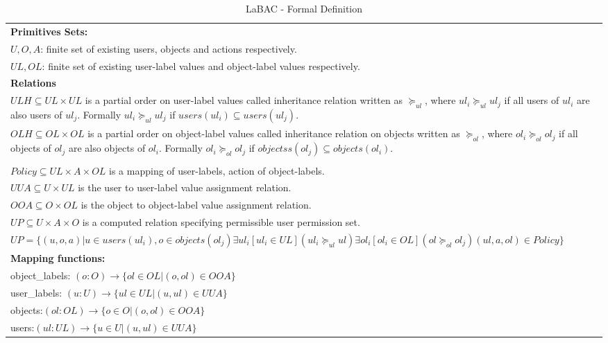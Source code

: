 \begin{table}[t] \footnotesize
\centering
\caption{LaBAC - Formal Definition}
\label{table:labac-formal-model}
\begin{tabular}{p{\textwidth}}

\hline
\noindent \textbf{ Primitives Sets:} \\
$U, O, A$: finite set of existing users, objects and actions respectively. \\
$UL, OL$: finite set of existing user-label values  and object-label values respectively. \\
\noindent \textbf{Relations} \\
$ULH \subseteq UL \times UL$  is a partial order on user-label values called inheritance relation written as $\succeq_{ul}$, where $ul_i \succeq_{ul} ul_j$ if all users of $ul_i$ are also users of $ul_j$. Formally $ul_i \succeq_{ul} ul_j$ if $users(ul_i) \subseteq users(ul_j)$. \\

$OLH \subseteq OL \times OL$  is a partial order on object-label values called inheritance relation on objects written as $\succeq_{ol}$, where $ol_i \succeq_{ol} ol_j$ if all objects of $ol_j$ are also objects of $ol_i$. Formally $ol_i \succeq_{ol} ol_j$ if $objectss(ol_j) \subseteq objects(ol_i)$. \\\\


$Policy \subseteq UL \times A \times OL$ is a mapping of user-labels, action of object-labels.\\

$UUA \subseteq U \times UL$ is the user to user-label value assignment relation.  \\ 
$OOA \subseteq O \times OL$ is the object to object-label value assignment relation. \\ 
$UP \subseteq U \times A \times O$ is a computed relation specifying  permissible user permission set.  \\ 
\noindent $UP= \{  (u,o,a) | u \in users(ul_i), o \in objects(ol_j)    \exists ul_i [ul_i \in UL ] (ul_i \succeq_{ul} ul) \exists ol_i [ol_i \in OL] (ol \succeq_{ol} ol_j) (ul,a,ol) \in Policy     \} $ \\
\noindent \textbf{Mapping functions:}\\
object\_labels: $(o:O) \to \{ ol \in OL | (o,ol) \in OOA\}$ \\
user\_labels: $(u:U) \to \{ ul \in UL | (u,ul) \in UUA\}$ \\
objects:$(ol:OL) \to \{o \in O | (o,ol) \in OOA\} $\\
users:$(ul:UL) \to \{u \in U | (u,ul) \in UUA\} $\\

\hline
\end{tabular}
\end{table}

